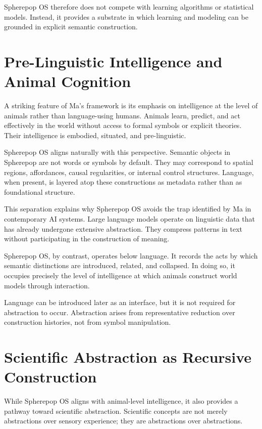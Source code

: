 \documentclass[11pt]{article}
\begin{document}
Spherepop OS therefore does not compete with learning algorithms or
statistical models. Instead, it provides a substrate in which learning and
modeling can be grounded in explicit semantic construction.

\section{Pre-Linguistic Intelligence and Animal Cognition}

A striking feature of Ma’s framework is its emphasis on intelligence at the
level of animals rather than language-using humans. Animals learn, predict,
and act effectively in the world without access to formal symbols or
explicit theories. Their intelligence is embodied, situated, and
pre-linguistic.

Spherepop OS aligns naturally with this perspective. Semantic objects in
Spherepop are not words or symbols by default. They may correspond to
spatial regions, affordances, causal regularities, or internal control
structures. Language, when present, is layered atop these constructions as
metadata rather than as foundational structure.

This separation explains why Spherepop OS avoids the trap identified by
Ma in contemporary AI systems. Large language models operate on linguistic
data that has already undergone extensive abstraction. They compress
patterns in text without participating in the construction of meaning.

Spherepop OS, by contrast, operates below language. It records the acts by
which semantic distinctions are introduced, related, and collapsed. In
doing so, it occupies precisely the level of intelligence at which animals
construct world models through interaction.

Language can be introduced later as an interface, but it is not required
for abstraction to occur. Abstraction arises from representative reduction
over construction histories, not from symbol manipulation.

\section{Scientific Abstraction as Recursive Construction}

While Spherepop OS aligns with animal-level intelligence, it also provides
a pathway toward scientific abstraction. Scientific concepts are not
merely abstractions over sensory experience; they are abstractions over
abstractions.
\end{document}
